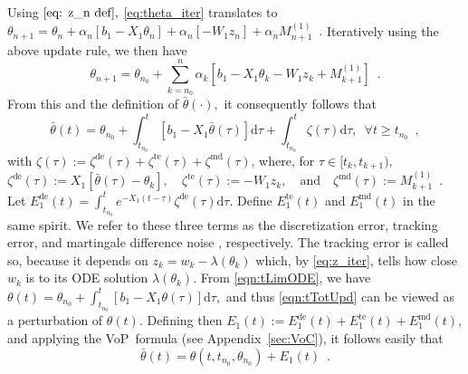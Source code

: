 \documentclass[usenames,dvipsnames,final,12pt]{colt2018} %
\newcommand{\vop}{VoP}
\newcommand{\bt}{b_1}
\newcommand{\Xt}{X_1}
\newcommand{\Wt}{W_1}
\newcommand{\Mt}{M^{(1)}}
\newcommand{\bart}{\bar{\theta}}
\newcommand{\Et}{E_1}
\newcommand{\tSol}[1]{\theta(#1, \tI{n_0}, \theta_{n_0})}
\newcommand{\zetD}{\zeta^{\dt}}
\newcommand{\zetM}{\zeta^{\md}}
\newcommand{\zetT}{\zeta^{\te}}
\newcommand{\EtD}{\Et^{\dt}}
\newcommand{\EtM}{\Et^{\md}}
\newcommand{\EtT}{\Et^{\te}}
\newcommand{\dt}{\text{de}}
\newcommand{\md}{\text{md}}
\newcommand{\te}{\text{te}}
\newcommand{\df}{\mathrm{d}}
\newcommand{\tI}[1]{t_{#1}}
\newcommand{\gal}[1]{#1}
\begin{document}
Using $\eqref{eq: z_n def},$  \eqref{eq:theta_iter} translates to
%
$
\theta_{n + 1} = \theta_n + \alpha_n[\bt - \Xt \theta_n] + \alpha_n [-\Wt z_n] + \alpha_n \Mt_{n + 1} \enspace.
$
%
Iteratively using the above update rule, we then have
%
\[
\theta_{n + 1} = \theta_{n_0} + \sum_{k = n_0}^{n} \alpha_k [\bt - \Xt \theta_k - \Wt z_k + \Mt_{k + 1}] \enspace.
\]
%
From this and the definition of $\bart(\cdot),$ it consequently follows that
%
\begin{equation}
\label{eqn:tTotUpd}
\bart(t) = \theta_{n_0} + \int_{\tI{n_0}}^{t}[\bt - \Xt \bart(\tau)] \df \tau + \int_{\tI{n_0}}^{t} \zeta(\tau) \df \tau, \enspace \forall t \geq \tI{n_0} \enspace,
\end{equation}
%
with $\zeta(\tau) := \zetD(\tau) + \zetT(\tau) + \zetM(\tau)$, %
where, for $\tau \in [\tI{k}, \tI{k + 1}),$
%
$
\zetD(\tau) := \Xt [\bart(\tau) - \theta_k], \quad   \zetT(\tau) := -\Wt z_k, \quad \text{and} \quad \zetM(\tau) := \Mt_{k + 1} \enspace.
$
%
Let $\EtD(t) = \int_{\tI{n_0}}^{t}e^{-\Xt(t -\tau)} \zetD(\tau) \df \tau$.
Define
$\EtT(t)$ and $\EtM(t)$ in the same spirit.
%
We refer to these three terms as the
discretization error, tracking error, and martingale difference noise%
, respectively.
The tracking error is called so, because it depends on $z_k = w_k-\lambda(\theta_k)$ which, by \eqref{eq:z_iter}, tells how close $w_k$ is to its ODE solution $\lambda(\theta_k)$.
%
From \eqref{eqn:tLimODE}, we have $\theta(t) = \theta_{n_0} + \int_{\tI{n_0}}^{t} [\bt - \Xt \theta(\tau)]\df \tau,$ and thus \eqref{eqn:tTotUpd} can be viewed as a perturbation of $\theta(t).$
Defining then $\Et(t) := \EtD(t) + \EtT(t) + \EtM(t)$, and applying the \vop\ formula \gal{(see Appendix~\ref{sec:VoC})}, it follows easily that
%
\begin{equation}
%
\bart(t) = \tSol{t} + \Et(t) \enspace. \label{eqn:TrajComp-t}
%
\end{equation}
%
\end{document}
